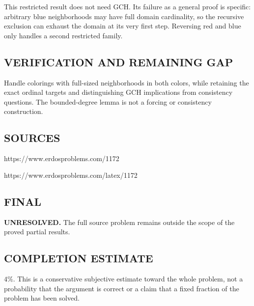 This restricted result does not need GCH. Its failure as a general proof is
specific: arbitrary blue neighborhoods may have full domain cardinality,
so the recursive exclusion can exhaust the domain at its very first step.
Reversing red and blue only handles a second restricted family.

\subsection*{VERIFICATION AND REMAINING GAP}
Handle colorings with full-sized neighborhoods in both colors, while retaining
the exact ordinal targets and distinguishing GCH implications from consistency
questions. The bounded-degree lemma is not a forcing or consistency construction.

\subsection*{SOURCES}
https://www.erdosproblems.com/1172

https://www.erdosproblems.com/latex/1172

\subsection*{FINAL}
\textbf{UNRESOLVED.} The full source problem remains outside the scope of the proved partial results.

\subsection*{COMPLETION ESTIMATE}
$4\%$. This is a conservative subjective estimate toward the whole problem, not a probability that the argument is correct or a claim that a fixed fraction of the problem has been solved.
